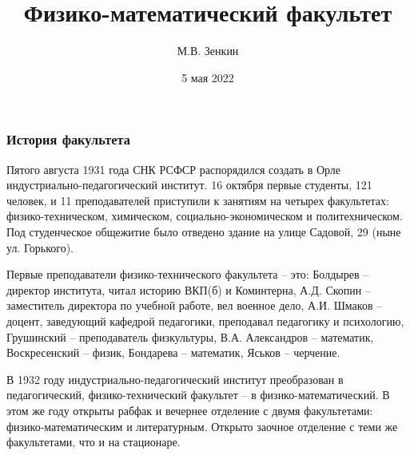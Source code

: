 \documentclass[pdf,hyperref={unicode}, aspectratio=43, serif,11pt]{beamer}
\title[ФизМат]{Физико-математический факультет}
\author{М.В. Зенкин}
\date{5 мая 2022}
\institute[]{Орловский государственный
университет имени И.\,С.~Тургенева}
\begin{document}
\begin{frame}
\titlepage
\end{frame}


\begin{frame}
\frametitle{История факультета}
\tiny{Пятого августа 1931 года СНК РСФСР распорядился создать в Орле индустриально-педагогический институт. 16 октября первые студенты, 121 человек, и 11 преподавателей приступили к занятиям на четырех факультетах: физико-техническом, химическом, социально-экономическом и политехническом. Под студенческое общежитие было отведено здание на улице Садовой, 29 (ныне ул. Горького).

Первые преподаватели физико-технического факультета – это: Болдырев – директор института, читал историю ВКП(б) и Коминтерна, А.Д. Скопин – заместитель директора по учебной работе, вел военное дело, А.И. Шмаков – доцент, заведующий кафедрой педагогики, преподавал педагогику и психологию, Грушинский – преподаватель физкультуры, В.А. Александров – математик, Воскресенский – физик, Бондарева – математик, Яськов – черчение.

В 1932 году индустриально-педагогический институт преобразован в педагогический, физико-технический факультет – в физико-математический. В этом же году открыты рабфак и вечернее отделение с двумя факультетами: физико-математическим и литературным. Открыто заочное отделение с теми же факультетами, что и на стационаре.}
\begin{figure}[!h]
\centering
{}
\end{figure}

\end{frame}
\end{document}
